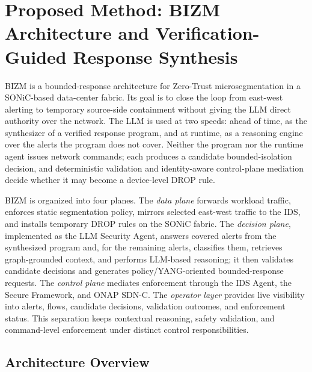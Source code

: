 \documentclass[final,5p]{elsarticle}
\begin{document}
\section{Proposed Method: BIZM Architecture and Verification-Guided Response Synthesis}
\label{sec:method}

BIZM is a bounded-response architecture for Zero-Trust microsegmentation in a SONiC-based data-center fabric. Its goal is to close the loop from east-west alerting to temporary source-side containment without giving the LLM direct authority over the network. The LLM is used at two speeds: ahead of time, as the synthesizer of a verified response program, and at runtime, as a reasoning engine over the alerts the program does not cover. Neither the program nor the runtime agent issues network commands; each produces a candidate bounded-isolation decision, and deterministic validation and identity-aware control-plane mediation decide whether it may become a device-level DROP rule.

BIZM is organized into four planes. The \emph{data plane} forwards workload traffic, enforces static segmentation policy, mirrors selected east-west traffic to the IDS, and installs temporary DROP rules on the SONiC fabric. The \emph{decision plane}, implemented as the LLM Security Agent, answers covered alerts from the synthesized program and, for the remaining alerts, classifies them, retrieves graph-grounded context, and performs LLM-based reasoning; it then validates candidate decisions and generates policy/YANG-oriented bounded-response requests. The \emph{control plane} mediates enforcement through the IDS Agent, the Secure Framework, and ONAP SDN-C. The \emph{operator layer} provides live visibility into alerts, flows, candidate decisions, validation outcomes, and enforcement status. This separation keeps contextual reasoning, safety validation, and command-level enforcement under distinct control responsibilities.

\subsection{Architecture Overview}
\label{sec:arch_overview}
\end{document}
